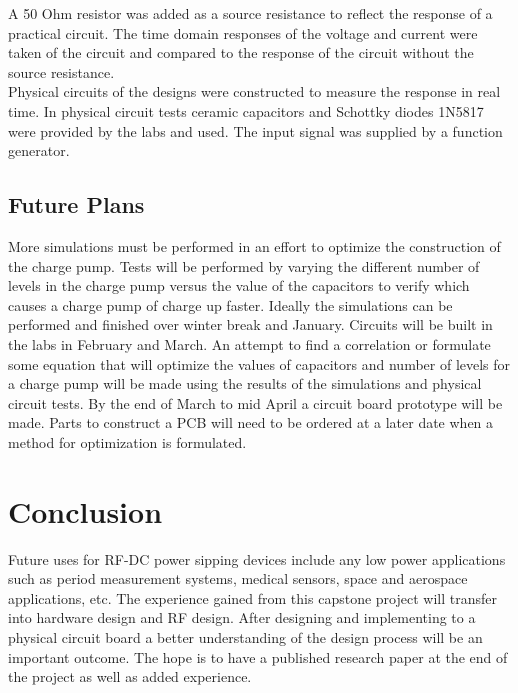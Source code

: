 \documentclass[12pt]{article}
\begin{document}
\noindent A 50 Ohm resistor was added as a source resistance to reflect the response of a practical circuit. The time domain responses of the voltage and current were taken of the circuit and compared to the response of the circuit without the source resistance.\\

\noindent Physical circuits of the designs were constructed to measure the response in real time. In physical circuit tests ceramic capacitors and Schottky diodes 1N5817 were provided by the labs and used. The input signal was supplied by a function generator.

	\subsection{Future Plans}
	More simulations must be performed in an effort to optimize the construction of the charge pump. Tests will be performed by varying the different number of levels in the charge pump versus the value of the capacitors to verify which causes a charge pump of charge up faster. Ideally the simulations can be performed and finished over winter break and January. Circuits will be built in the labs in February and March. An attempt to find a correlation or formulate some equation that will optimize the values of capacitors and number of levels for a charge pump will be made using the results of the simulations and physical circuit tests. By the end of March to mid April a circuit board prototype will be made. Parts to construct a PCB will need to be ordered at a later date when a method for optimization is formulated.
	
	\section{Conclusion}
	Future uses for RF-DC power sipping devices include any low power applications such as period measurement systems, medical sensors, space and aerospace applications, etc. The experience gained from this capstone project will transfer into hardware design and RF design. After designing and implementing to a physical circuit board a better understanding of the design process will be an important outcome. The hope is to have a published research paper at the end of the project as well as added experience.
	
	\newpage\label{bibliography}
	\nocite{*}
	\printbibliography
	
\end{document}
